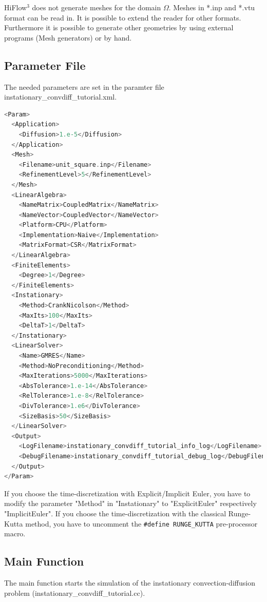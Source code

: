 \documentclass[a4paper, 11pt, twoside]{article}
\begin{document}
HiFlow$^3$ does not generate meshes for the domain $\Omega$. Meshes in *.inp and *.vtu format can be read in. 
It is possible to extend the reader for other formats.
Furthermore it is possible to generate other geometries by using external programs (Mesh generators) or by hand.\\ 

\subsection{Parameter File}\label{sectionparameter file}
The needed parameters are set in the paramter file instationary\_convdiff\_tutorial.xml.
\begin{lstlisting}[language=C++, basicstyle={\footnotesize, \ttfamily}, keywordstyle=\color{blue}, numbers=none, tabsize=4] 
<Param>
  <Application>
    <Diffusion>1.e-5</Diffusion>
  </Application>
  <Mesh>
    <Filename>unit_square.inp</Filename>
    <RefinementLevel>5</RefinementLevel>
  </Mesh>
  <LinearAlgebra>
    <NameMatrix>CoupledMatrix</NameMatrix>
    <NameVector>CoupledVector</NameVector>
    <Platform>CPU</Platform>
    <Implementation>Naive</Implementation>
    <MatrixFormat>CSR</MatrixFormat>
  </LinearAlgebra>
  <FiniteElements>
    <Degree>1</Degree>
  </FiniteElements>
  <Instationary>
    <Method>CrankNicolson</Method>
    <MaxIts>100</MaxIts>
    <DeltaT>1</DeltaT>
  </Instationary>
  <LinearSolver>
    <Name>GMRES</Name>
    <Method>NoPreconditioning</Method>
    <MaxIterations>5000</MaxIterations>
    <AbsTolerance>1.e-14</AbsTolerance>
    <RelTolerance>1.e-8</RelTolerance>
    <DivTolerance>1.e6</DivTolerance>
    <SizeBasis>50</SizeBasis>
  </LinearSolver>
  <Output>
    <LogFilename>instationary_convdiff_tutorial_info_log</LogFilename>
    <DebugFilename>instationary_convdiff_tutorial_debug_log</DebugFilename>
  </Output>
</Param>
\end{lstlisting}
If you choose the time-discretization with Explicit/Implicit Euler, you have to modify the parameter "Method" in "Instationary" to "ExplicitEuler" respectively "ImplicitEuler".
If you choose the time-discretization with the classical Runge-Kutta method, you have to uncomment the \texttt{\#define RUNGE\_KUTTA} pre-processor macro.

\subsection{Main Function}\label{sectionmain}
The main function starts the simulation of the instationary convection-diffusion problem (instationary\_convdiff\_tutorial.cc).
\end{document}
